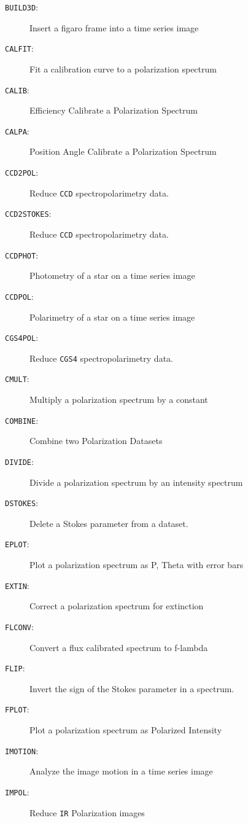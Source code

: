 \documentclass[11pt,twoside,nolof,noabs]{starlink}
\newenvironment{mansectionroutines}{\begin{description}}{\end{description}}
\newcommand{\mansectionitem}[1]{\item[#1:]}
\providecommand{\mantt}[1]{\texttt{#1}}
\begin{document}
\begin{mansectionroutines}
\mansectionitem{{\mantt{BUILD3D}}}
        Insert a figaro frame into a time series image

\mansectionitem{{\mantt{CALFIT}}}
        Fit a calibration curve to a polarization spectrum

\mansectionitem{{\mantt{CALIB}}}
        Efficiency Calibrate a Polarization Spectrum

\mansectionitem{{\mantt{CALPA}}}
        Position Angle Calibrate a Polarization Spectrum

\mansectionitem{{\mantt{CCD2POL}}}
        Reduce {\mantt{CCD}} spectropolarimetry data.

\mansectionitem{{\mantt{CCD2STOKES}}}
        Reduce {\mantt{CCD}} spectropolarimetry data.

\mansectionitem{{\mantt{CCDPHOT}}}
        Photometry of a star on a time series image

\mansectionitem{{\mantt{CCDPOL}}}
        Polarimetry of a star on a time series image

\mansectionitem{{\mantt{CGS4POL}}}
        Reduce {\mantt{CGS4}} spectropolarimetry data.

\mansectionitem{{\mantt{CMULT}}}
        Multiply a polarization spectrum by a constant

\mansectionitem{{\mantt{COMBINE}}}
        Combine two Polarization Datasets

\mansectionitem{{\mantt{DIVIDE}}}
        Divide a polarization spectrum by an intensity spectrum

\mansectionitem{{\mantt{DSTOKES}}}
        Delete a Stokes parameter from a dataset.

\mansectionitem{{\mantt{EPLOT}}}
        Plot a polarization spectrum as P, Theta with error bars

\mansectionitem{{\mantt{EXTIN}}}
        Correct a polarization spectrum for extinction

\mansectionitem{{\mantt{FLCONV}}}
        Convert a flux calibrated spectrum to f-lambda

\mansectionitem{{\mantt{FLIP}}}
        Invert the sign of the Stokes parameter in a spectrum.

\mansectionitem{{\mantt{FPLOT}}}
        Plot a polarization spectrum as Polarized Intensity

\mansectionitem{{\mantt{IMOTION}}}
        Analyze the image motion in a time series image

\mansectionitem{{\mantt{IMPOL}}}
        Reduce {\mantt{IR}} Polarization images


\end{mansectionroutines}
\end{document}
